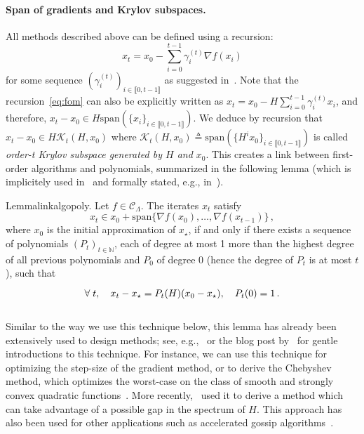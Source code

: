 \documentclass{article}
\newcommand{\Span}{\mathrm{span}}
\newcommand{\xs}{x_\star}
\begin{document}
    \paragraph{Span of gradients and Krylov subspaces.}
    All methods described above can be defined using a recursion:
    \begin{equation}
        x_{t} = x_0 - \sum_{i=0}^{t-1} \gamma_i^{(t)} \nabla f(x_i) \label{eq:fom}
    \end{equation}
    for some sequence $(\gamma_i^{(t)})_{i\in \llbracket 0, t-1 \rrbracket}$ as suggested in~\citep{nemirovsky1992information, nemirovski1994efficient}.
    Note that the recursion~\cref{eq:fom} can also be explicitly written as $x_{t} = x_0 - H \sum_{i=0}^{t-1} \gamma_i^{(t)} x_i$,
    and therefore, $x_{t} - x_0 \in H \Span(\{x_i\}_{i\in\llbracket 0, t-1 \rrbracket})$.
    We deduce by recursion that $x_t - x_0 \in H \mathcal{K}_t(H, x_0)$ where $\mathcal{K}_t(H, x_0) \triangleq \Span(\{H^i x_0\}_{i\in\llbracket 0, t-1 \rrbracket})$ is called \emph{order-t Krylov subspace generated by $H$ and $x_0$}.
    This creates a link between first-order algorithms and polynomials, summarized in the following lemma (which is implicitely used in~\citet{golub1961chebyshev} and formally stated, e.g., in~\citep[Proposition 4.1]{goujaud2022super}).
    \begin{restatable}{Lemma}{linkalgopoly}\label{lemma:link_algo_poly}.
        Let $f\in\mathcal{C}_{\Lambda}$.
        The iterates $x_t$ satisfy
        \begin{equation}
            x_{t} \in x_0 + \Span\{ \nabla f(x_0),\ldots, \nabla f(x_{t-1}) \} \,, \label{def:first_order_algo}
        \end{equation}
        where $x_0$ is the initial approximation of $\xs$, if and only if there exists a sequence of polynomials $(P_t)_{t\in\mathbb{N}}$, each of degree at most 1 more than the highest degree of all previous polynomials and $P_0$ of degree 0 (hence the degree of $P_t$ is at most $t$), such that
        \begin{equation}
            \vphantom{\sum_i}\forall \;t, \quad x_t - \xs = P_t(H)(x_0-\xs), \quad P_t(0)=1\,. \label{eq:link_polynomial}
        \end{equation}
    \end{restatable}
    Similar to the way we use this technique below, this lemma has already been extensively used to design methods;
    see, e.g.,~\citet[Chapter 1]{d2021acceleration} or the blog post by~\citet{pedregosa2021residual} for gentle introductions to this technique.
    For instance, we can use this technique for optimizing the step-size of the gradient method, or to derive the Chebyshev method, which optimizes the worst-case on the class of smooth and strongly convex quadratic functions~\citep[see][]{fischer2011polynomial}.
    More recently,~\citet{goujaud2022super} used it to derive a method which can take advantage of a possible gap in the spectrum of $H$.
    This approach has also been used for other applications such as accelerated gossip algorithms~\citep{berthier2020accelerated}.
\end{document}
